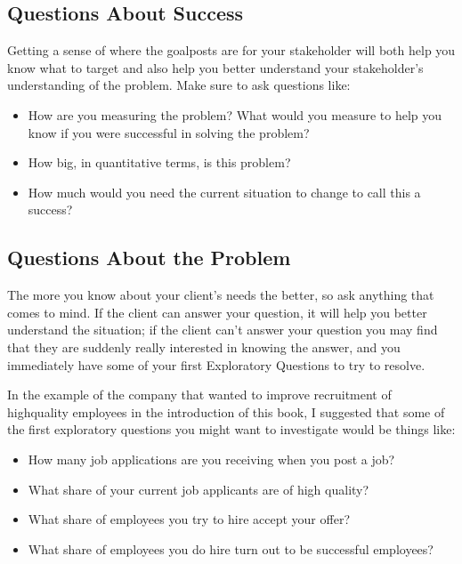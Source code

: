 \documentclass[letterpaper,10pt,english]{jupyterBook}
\begin{document}
\subsection{Questions About Success}
\label{\detokenize{20_problems_to_questions/20_stakeholder_management:questions-about-success}}
\sphinxAtStartPar
Getting a sense of where the goalposts are for your stakeholder will both help you know what to target and also help you better understand your stakeholder’s understanding of the problem. Make sure to ask questions like:
\begin{itemize}
\item {} 
\sphinxAtStartPar
How are you measuring the problem? What would you measure to help you know if you were successful in solving the problem?

\item {} 
\sphinxAtStartPar
How big, in quantitative terms, is this problem?

\item {} 
\sphinxAtStartPar
How much would you need the current situation to change to call this a success?

\end{itemize}


\subsection{Questions About the Problem}
\label{\detokenize{20_problems_to_questions/20_stakeholder_management:questions-about-the-problem}}
\sphinxAtStartPar
The more you know about your client’s needs the better, so ask anything that comes to mind. If the client can answer your question, it will help you better understand the situation; if the client can’t answer your question you may find that they are suddenly really interested in knowing the answer, and you immediately have some of your first Exploratory Questions to try to resolve.

\sphinxAtStartPar
In the example of the company that wanted to improve recruitment of high\sphinxhyphen{}quality employees in the introduction of this book, I suggested that some of the first exploratory questions you might want to investigate would be things like:
\begin{itemize}
\item {} 
\sphinxAtStartPar
How many job applications are you receiving when you post a job?

\item {} 
\sphinxAtStartPar
What share of your current job applicants are of high quality?

\item {} 
\sphinxAtStartPar
What share of employees you try to hire accept your offer?

\item {} 
\sphinxAtStartPar
What share of employees you do hire turn out to be successful employees?

\end{itemize}
\end{document}
